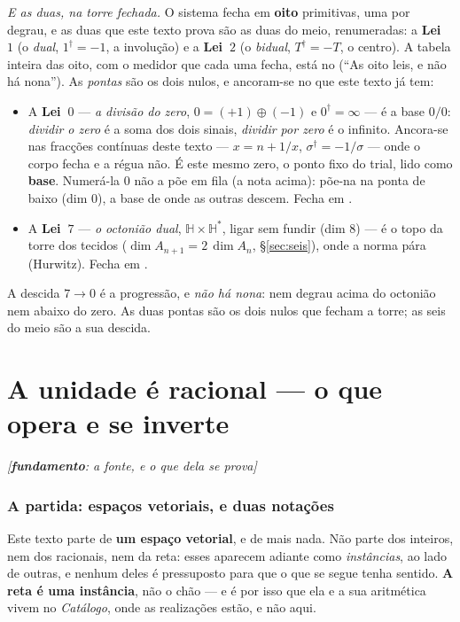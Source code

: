 \documentclass[livro.tex]{subfiles}
\begin{document}
\medskip
\noindent \emph{E as duas, na torre fechada.} O sistema fecha em \textbf{oito} primitivas, uma por
degrau, e as duas que este texto prova são as duas do meio, renumeradas: a \textbf{Lei~$1$}
(o \emph{dual}, $1^{\dagger}=-1$, a involução) e a \textbf{Lei~$2$} (o \emph{bidual},
$T^{\dagger}=-T$, o centro). A tabela inteira das oito, com o medidor que cada uma fecha, está no
 (``As oito leis, e não há nona''). As \emph{pontas} são os dois
nulos, e ancoram-se no que este texto já tem:
\begin{itemize}\itemsep2pt
\item A \textbf{Lei~$0$} --- \emph{a divisão do zero}, $0=(+1)\oplus(-1)$ e $0^{\dagger}=\infty$ ---
é a base $0/0$: \emph{dividir o zero} é a soma dos dois sinais, \emph{dividir por zero} é o infinito.
Ancora-se nas fracções contínuas deste texto --- $x=n+1/x$, $\sigma^{\dagger}=-1/\sigma$ --- onde o
corpo fecha e a régua não. É este mesmo zero, o ponto fixo do trial, lido como \textbf{base}.
Numerá-la $0$ não a põe em fila (a nota acima): põe-na na ponta de baixo (dim $0$), a base de onde as
outras descem. Fecha em .
\item A \textbf{Lei~$7$} --- \emph{o octonião dual}, $\mathbb{H}\times\mathbb{H}^{*}$, ligar sem
fundir (dim $8$) --- é o topo da torre dos tecidos ($\dim A_{n+1}=2\,\dim A_n$, \S\ref{sec:seis}),
onde a norma pára (Hurwitz). Fecha em .
\end{itemize}
\noindent A descida $7\to0$ é a progressão, e \emph{não há nona}: nem degrau acima do octonião nem
abaixo do zero. As duas pontas são os dois nulos que fecham a torre; as seis do meio são a sua
descida.



\part{A unidade é racional --- o que opera e se inverte}
\noindent\hfill\emph{\small[\textbf{fundamento}: a fonte, e o que dela se prova]}\medskip


\section{A partida: espaços vetoriais, e duas notações}\label{sec:partida}

Este texto parte de \textbf{um espaço vetorial}, e de mais nada. Não parte dos inteiros, nem dos
racionais, nem da reta: esses aparecem adiante como \emph{instâncias}, ao lado de outras, e nenhum
deles é pressuposto para que o que se segue tenha sentido. \textbf{A reta é uma instância}, não o
chão --- e é por isso que ela e a sua aritmética vivem no \emph{Catálogo}, onde as realizações
estão, e não aqui.
\end{document}
